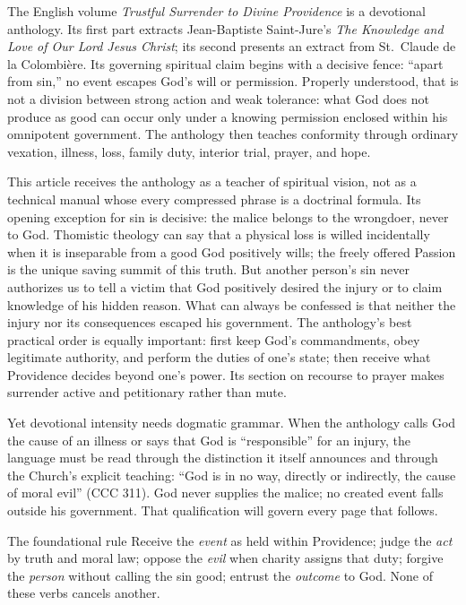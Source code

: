 The English volume \emph{Trustful Surrender to Divine Providence} is a devotional anthology. Its first part extracts Jean-Baptiste Saint-Jure's \emph{The Knowledge and Love of Our Lord Jesus Christ}; its second presents an extract from St.~Claude de la Colombière. Its governing spiritual claim begins with a decisive fence: ``apart from sin,'' no event escapes God's will or permission. Properly understood, that is not a division between strong action and weak tolerance: what God does not produce as good can occur only under a knowing permission enclosed within his omnipotent government. The anthology then teaches conformity through ordinary vexation, illness, loss, family duty, interior trial, prayer, and hope.

This article receives the anthology as a teacher of spiritual vision, not as a technical manual whose every compressed phrase is a doctrinal formula. Its opening exception for sin is decisive: the malice belongs to the wrongdoer, never to God. Thomistic theology can say that a physical loss is willed incidentally when it is inseparable from a good God positively wills; the freely offered Passion is the unique saving summit of this truth. But another person's sin never authorizes us to tell a victim that God positively desired the injury or to claim knowledge of his hidden reason. What can always be confessed is that neither the injury nor its consequences escaped his government. The anthology's best practical order is equally important: first keep God's commandments, obey legitimate authority, and perform the duties of one's state; then receive what Providence decides beyond one's power. Its section on recourse to prayer makes surrender active and petitionary rather than mute.

Yet devotional intensity needs dogmatic grammar. When the anthology calls God the cause of an illness or says that God is ``responsible'' for an injury, the language must be read through the distinction it itself announces and through the Church's explicit teaching: ``God is in no way, directly or indirectly, the cause of moral evil'' (CCC 311). God never supplies the malice; no created event falls outside his government. That qualification will govern every page that follows.

\begin{massbox}{The foundational rule}
Receive the \emph{event} as held within Providence; judge the \emph{act} by truth and moral law; oppose the \emph{evil} when charity assigns that duty; forgive the \emph{person} without calling the sin good; entrust the \emph{outcome} to God. None of these verbs cancels another.
\end{massbox}
